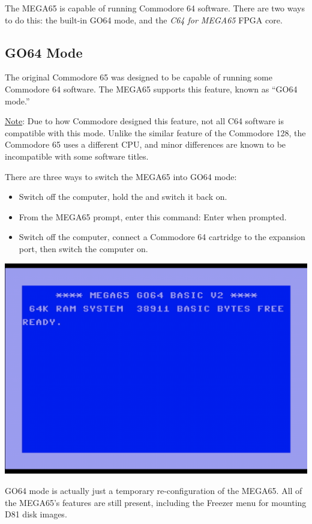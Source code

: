 The MEGA65 is capable of running Commodore 64 software. There are two ways to do this: the built-in GO64 mode, and the {\it C64 for MEGA65} FPGA core.

\subsection{GO64 Mode}

The original Commodore 65 was designed to be capable of running some Commodore 64 software. The MEGA65 supports this feature, known as ``GO64 mode.''

\underline{Note}: Due to how Commodore designed this feature, not all C64 software is compatible with this mode. Unlike the similar feature of the Commodore 128, the Commodore 65 uses a different CPU, and minor differences are known to be incompatible with some software titles.

There are three ways to switch the MEGA65 into GO64 mode:

\begin{itemize}
    \item Switch off the computer, hold the \megasymbolkey and switch it back on.
    \item From the MEGA65  prompt, enter this command:  Enter  when prompted.
    \item Switch off the computer, connect a Commodore 64 cartridge to the expansion port, then switch the computer on.
\end{itemize}

\begin{center}
  \includegraphics[width=0.7\linewidth]{images/go64.png}
\end{center}

GO64 mode is actually just a temporary re-configuration of the MEGA65. All of the MEGA65's features are still present, including the Freezer menu for mounting D81 disk images.


